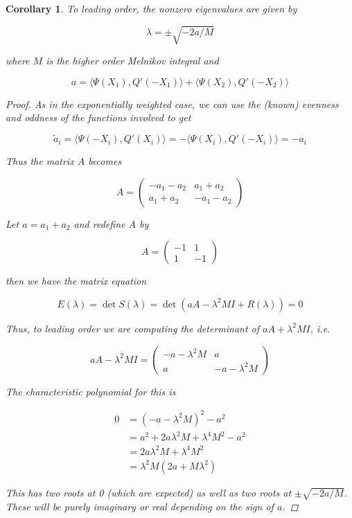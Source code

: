 \documentclass[12pt]{article}
\newtheorem{corollary}{Corollary}
\begin{document}
\begin{corollary}
To leading order, the nonzero eigenvalues are given by

\begin{equation}
\lambda = \pm \sqrt{-2a/M}
\end{equation}

where $M$ is the higher order Melnikov integral and 

\begin{equation}
a = \langle \Psi (X_1), Q'(-X_1) \rangle 
+ \langle \Psi (X_2), Q'(-X_2) \rangle 
\end{equation}

\begin{proof}

As in the exponentially weighted case, we can use the (known) evenness and oddness of the functions involved to get

\[
\tilde{a}_i = \langle \Psi(-X_i), Q'(X_i) \rangle = -\langle \Psi(X_i), Q'(-X_i) \rangle = -a_i
\]

Thus the matrix $A$ becomes

\[
A = 
\begin{pmatrix}
-a_1 - a_2 & a_1 + a_2 \\
a_1 + a_2 & -a_1 - a_2 
\end{pmatrix}
\]

Let $a = a_1 + a_2$ and redefine $A$ by

\[
A = 
\begin{pmatrix}
-1 & 1 \\
1 & -1
\end{pmatrix}
\]

then we have the matrix equation

\[
E(\lambda) = \det S(\lambda) = \det(a A - \lambda^2 MI + R(\lambda) ) = 0
\]

Thus, to leading order we are computing the determinant of $a A + \lambda^2 MI$, i.e. 

\[
a A - \lambda^2 MI = 
\begin{pmatrix}
-a - \lambda^2 M & a \\
a & -a - \lambda^2 M
\end{pmatrix}
\]

The characteristic polynomial for this is

\begin{align*}
0 &= (-a - \lambda^2 M)^2 - a^2 \\
&= a^2 + 2 a \lambda^2 M + \lambda^4 M^2 - a^2 \\
&= 2 a \lambda^2 M + \lambda^4 M^2 \\
&= \lambda^2 M (2a + M \lambda^2 )
\end{align*}

This has two roots at 0 (which are expected) as well as two roots at $\pm \sqrt{-2a/M}$. These will be purely imaginary or real depending on the sign of $a$.

\end{proof}
\end{corollary}
\end{document}
